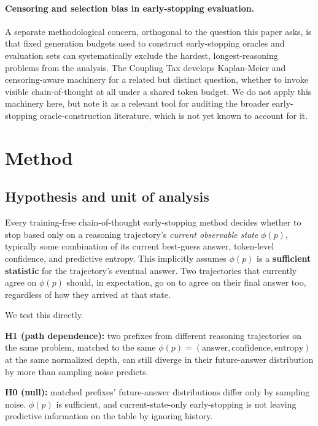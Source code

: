 \documentclass{article}
\begin{document}
\paragraph{Censoring and selection bias in early-stopping evaluation.} A separate methodological concern, orthogonal to the question this paper asks, is that fixed generation budgets used to construct early-stopping oracles and evaluation sets can systematically exclude the hardest, longest-reasoning problems from the analysis. The Coupling Tax \citep{couplingtax2026} develops Kaplan-Meier and censoring-aware machinery for a related but distinct question, whether to invoke visible chain-of-thought at all under a shared token budget. We do not apply this machinery here, but note it as a relevant tool for auditing the broader early-stopping oracle-construction literature, which is not yet known to account for it.

\section{Method}
\label{sec:method}

\subsection{Hypothesis and unit of analysis}
\label{sec:method-hyp}

Every training-free chain-of-thought early-stopping method decides whether to stop based only on a reasoning trajectory's \emph{current observable state} $\phi(p)$, typically some combination of its current best-guess answer, token-level confidence, and predictive entropy. This implicitly assumes $\phi(p)$ is a \textbf{sufficient statistic} for the trajectory's eventual answer. Two trajectories that currently agree on $\phi(p)$ should, in expectation, go on to agree on their final answer too, regardless of how they arrived at that state.

We test this directly.

\textbf{H1 (path dependence):} two prefixes from different reasoning trajectories on the same problem, matched to the same $\phi(p) = (\text{answer}, \text{confidence}, \text{entropy})$ at the same normalized depth, can still diverge in their future-answer distribution by more than sampling noise predicts.

\textbf{H0 (null):} matched prefixes' future-answer distributions differ only by sampling noise. $\phi(p)$ is sufficient, and current-state-only early-stopping is not leaving predictive information on the table by ignoring history.
\end{document}
